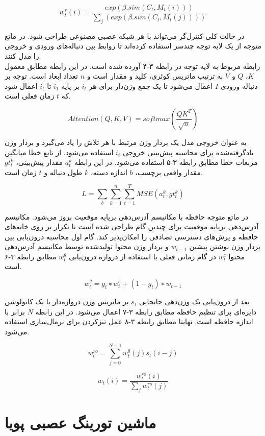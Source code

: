\begin{equation}
w_t^r(i) = \frac{exp(\beta.sim(C_t,M_t(i)))}{\sum_j(exp(\beta.sim(C_t,M_t(j))))}
\end{equation}

در حالت کلی کنترل‌گر می‌تواند با هر شبکه عصبی مصنوعی طراحی شود. در ماتع متوجه از یک لایه توجه چندسر استفاده کرده‌اند تا روابط بین دنباله‌های ورودی و خروجی را مدل کنند. \cite{zhao2020cold}
\\

رابطه مربوط به لایه توجه در رابطه ۳-۴ آورده شده است. در این رابطه مطابق معمول $K$، $Q$ و $V$ به ترتیب ماتریس کوئری، کلید و مقدار است و $n$ تعداد ابعاد است. توجه بر دنباله ورودی $I$ اعمال می‌شود تا یک جمع وزن‌دار برای هر $i_t$ بر پایه $i_1$ تا $i_t$ اعمال شود که $t$ زمان فعلی است.\cite{zhao2020cold} 

\begin{equation}
Attention(Q,K,V) = softmax(\frac{QK^T}{\sqrt{n}})
\end{equation}

به عنوان خروجی مدل یک بردار وزن مرتبط با هر تلاش را یاد می‌گیرد و بردار وزن یادگرفته‌شده برای محاسبه پیش‌بینی خروجی $i_t$ استفاده می‌شود. از تابع خطا میانگین مربعات خطا مطابق رابطه ۳-۵ استفاده می‌شود. در این رابطه $a_t^k$ مقدار پیش‌بینی، $gt_t^k$ مقدار واقعی برچسب، $b$ اندازه دسته، $k$ طول دنباله و $t$ زمان است.\cite{zhao2020cold}

\begin{equation}
L = \sum_b \sum_{k=1}^n \sum_{t=1}^T MSE(a_t^k, gt_t^k)
\end{equation}

در ماتع متوجه حافظه با مکانیسم آدرس‌دهی برپایه موقعیت بروز می‌شود. مکانیسم آدرس‌دهی برپایه موقعیت برای چندین گام طراحی شده است تا تکرار بر روی خانه‌های حافظه و پرش‌های دسترسی تصادفی را امکان‌پذیر کند. گام اول محاسبه درون‌یابی بین بردار وزن نوشتن پیشین $w_{t-1}$ و بردار وزن محتوا تولیدشده توسط مکانیسم آدرس‌دهی محتوا $w_t^c$ در گام زمانی فعلی با استفاده از دروازه درون‌یابی $w_t^g$ مطابق رابطه ۳-۶ است.\cite{zhao2020cold}

\begin{equation}
w^g_t = g_t ∗ w^c_t + (1−g_t) ∗ w_{t−1}
\end{equation}

بعد از درون‌یابی یک وزن‌دهی جابجایی $s_t$ بر ماتریس وزن دروازه‌دار با یک کانولوشن دایره‌ای برای تنظیم حافظه مطابق رابطه ۳-۷ اعمال می‌شود. در این رابطه $N$ برابر با اندازه حافظه است. نهایتا مطابق رابطه ۳-۸ عمل تیزکردن برای نرمال‌سازی استفاده می‌شود.\cite{zhao2020cold}

\begin{equation}
w_t^{ro} = \sum_{j=0}^{N-1}w_t^g(j)s_t(i-j)
\end{equation}

\begin{equation}
w_t(i) = \frac{w_t^{ro}(i)}{\sum_j w_t^{ro}(j)}
\end{equation}



\section{ماشین تورینگ عصبی پویا}
